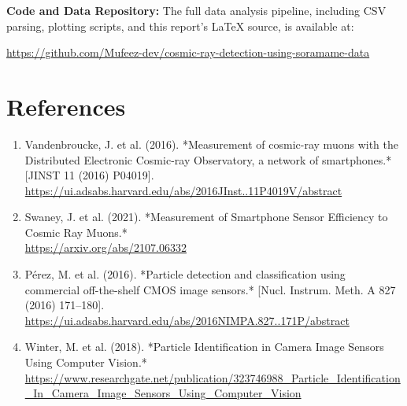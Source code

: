 \documentclass[12pt]{article}
\begin{document}
	\pagebreak
	\noindent\textbf{Code and Data Repository:} The full data analysis pipeline, including CSV parsing, plotting scripts, and this report's LaTeX source, is available at:
	
	\url{https://github.com/Mufeez-dev/cosmic-ray-detection-using-soramame-data}
	
	\section*{References}
	\begin{enumerate}
		\item Vandenbroucke, J. et al. (2016). *Measurement of cosmic-ray muons with the Distributed Electronic Cosmic-ray Observatory, a network of smartphones.* [JINST 11 (2016) P04019].\\
		\url{https://ui.adsabs.harvard.edu/abs/2016JInst..11P4019V/abstract}
		
		\item Swaney, J. et al. (2021). *Measurement of Smartphone Sensor Efficiency to Cosmic Ray Muons.*\\
		\url{https://arxiv.org/abs/2107.06332}
		
		\item Pérez, M. et al. (2016). *Particle detection and classification using commercial off-the-shelf CMOS image sensors.* [Nucl. Instrum. Meth. A 827 (2016) 171–180].\\
		\url{https://ui.adsabs.harvard.edu/abs/2016NIMPA.827..171P/abstract}
		
		\item Winter, M. et al. (2018). *Particle Identification in Camera Image Sensors Using Computer Vision.*\\
		\url{https://www.researchgate.net/publication/323746988_Particle_Identification_In_Camera_Image_Sensors_Using_Computer_Vision}
	\end{enumerate}
	
	
	
	
\end{document}

